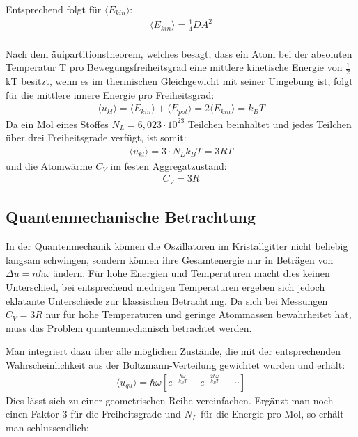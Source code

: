 Entsprechend folgt für $\langle E_{kin}\rangle$:
\begin{align*}
\langle E_{kin}\rangle = \frac{1}{4} DA^2
\end{align*}\\

Nach dem äuipartitionstheorem, welches besagt, dass ein Atom bei der absoluten Temperatur T pro Bewegungsfreiheitsgrad eine
mittlere kinetische Energie von $\frac{1}{2}$ kT besitzt, wenn es im thermischen Gleichgewicht mit seiner Umgebung ist, folgt für die mittlere innere Energie pro Freiheitsgrad:
\begin{align*}
\langle u_{kl} \rangle = \langle E_{kin}\rangle + \langle E_{pot}\rangle = 2\langle E_{kin}\rangle = k_B T
\end{align*}
Da ein Mol eines Stoffes $N_L = 6,023\cdot 10^{23}$ Teilchen beinhaltet und jedes Teilchen über drei Freiheitsgrade verfügt, ist somit:
\begin{align*}
\langle u_{kl} \rangle = 3\cdot N_L k_B T = 3RT
\end{align*}
und die Atomwärme $C_V$ im festen Aggregatzustand:
\begin{align*}
C_V =3R
\end{align*}
\subsection{Quantenmechanische Betrachtung}
In der Quantenmechanik können die Oszillatoren im Kristallgitter nicht beliebig langsam schwingen, sondern können ihre Gesamtenergie nur in Beträgen von $\Delta u = n\hbar \omega$ ändern. Für hohe Energien und Temperaturen macht dies keinen Unterschied, bei entsprechend niedrigen Temperaturen ergeben sich jedoch eklatante Unterschiede zur klassischen Betrachtung. Da sich bei Messungen $C_V = 3R$ nur für hohe Temperaturen und geringe Atommassen bewahrheitet hat, muss das Problem quantenmechanisch betrachtet werden.

Man integriert dazu über alle möglichen Zustände, die mit der entsprechenden Wahrscheinlichkeit aus der Boltzmann-Verteilung gewichtet wurden und erhält:
\begin{align*}
\langle u_{qu} \rangle = \hbar \omega \left[ e^{-\frac{\hbar \omega}{k_BT}} +e^{-\frac{2\hbar \omega}{k_BT}}+\cdots\right]
\end{align*} 
Dies lässt sich zu einer geometrischen Reihe vereinfachen. Ergänzt man noch einen Faktor 3 für die Freiheitsgrade und $N_L$ für die Energie pro Mol, so erhält man schlussendlich:

